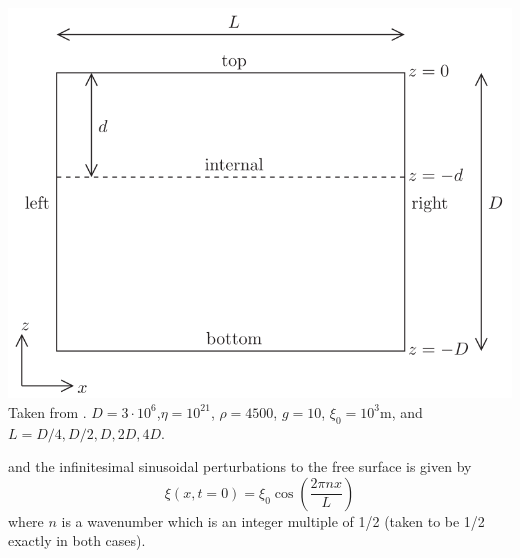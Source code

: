 \begin{center}
\begin{minipage}{0.45\textwidth}
\includegraphics[height=0.8\textwidth]{images/benchmark_relaxation/krwd12}\\
{\small Taken from \cite{krwd12}. $D=3\cdot 10^6$,$\eta=10^{21}$, $\rho=4500$, $g=10$, $\xi_0=10^3$m, and 
$L=D/4,D/2,D,2D,4D$.}
\end{minipage}
\end{center}
and the infinitesimal sinusoidal perturbations to the free surface is given by
\[
\xi(x,t=0)=\xi_0 \cos \left( \frac{2 \pi n x}{L}  \right)
\]
where $n$ is a wavenumber which is an integer multiple of 1/2 (taken to be 1/2 exactly in both cases).



